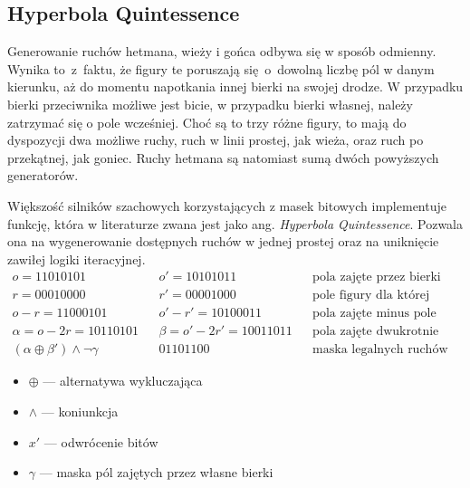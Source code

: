 \subsection{Hyperbola Quintessence}
\label{subsec:hyperbola-quintessence}

Generowanie ruchów hetmana, wieży i gońca odbywa się w sposób odmienny.
Wynika to~z~faktu, że figury te poruszają się~o~dowolną liczbę pól w danym kierunku, aż do momentu napotkania innej bierki na swojej drodze.
W przypadku bierki przeciwnika możliwe jest bicie, w przypadku bierki własnej, należy zatrzymać się o pole wcześniej.
Choć są to trzy różne figury, to mają do dyspozycji dwa możliwe ruchy, ruch w linii prostej, jak wieża, oraz ruch po przekątnej, jak goniec.
Ruchy hetmana są natomiast sumą dwóch powyższych generatorów.

Większość silników szachowych korzystających z masek bitowych implementuje funkcję, która w literaturze zwana jest jako ang. \emph{Hyperbola Quintessence}.
Pozwala ona na wygenerowanie dostępnych ruchów w jednej prostej oraz na uniknięcie zawiłej logiki iteracyjnej.
\begin{align*}
    o = \text{11010101} && o' = \text{10101011} && \text{pola zajęte przez bierki} \\
    r = \text{00010000} && r' = \text{00001000} && \text{pole figury dla której generujemy ruchy} \\
    o-r = \text{11000101} && o'-r' = \text{10100011} && \text{pola zajęte minus pole figury} \\
    \alpha = o-2r = \text{10110101} && \beta = o'-2r' = \text{10011011} && \text{pola zajęte dwukrotnie minus pole figury} \\
    (\alpha \oplus \beta') \wedge \neg \gamma && \text{01101100} && \text{maska legalnych ruchów}
\end{align*}
\begin{multicols}{2}
    \begin{itemize}[label={}]
        \item \(\oplus\) — alternatywa wykluczająca
        \item \(\wedge\) — koniunkcja
        \item \(x'\) — odwrócenie bitów
        \item \(\gamma\) — maska pól zajętych przez własne bierki
    \end{itemize}
\end{multicols}




